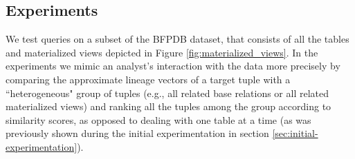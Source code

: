 
\subsection{Experiments}
\begin{runexperiment}
We test queries on a subset of the BFPDB dataset, that consists of all the tables and materialized views depicted in Figure \ref{fig:materialized_views}. In the experiments we mimic an analyst's interaction with the data more precisely by comparing the approximate lineage vectors of a target tuple with a ``heterogeneous" group of tuples (e.g., all related base relations or all related materialized views) and ranking all the tuples among the group according to similarity scores, as opposed to dealing with one table at a time (as was previously shown during the initial experimentation in section \ref{sec:initial-experimentation}).
\end{runexperiment}

